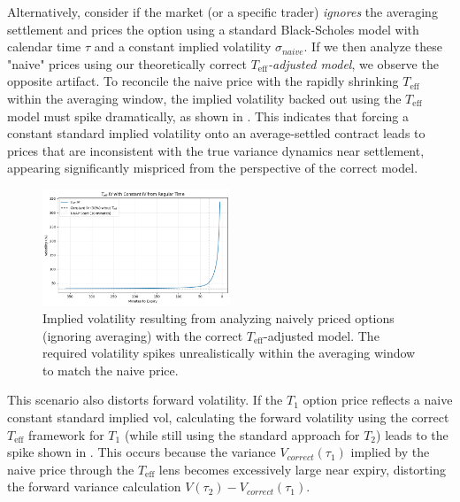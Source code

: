 \documentclass[11pt]{article}
\theoremstyle{plain}
\begin{document}
Alternatively, consider if the market (or a specific trader) \textit{ignores} the averaging settlement and prices the option using a standard Black-Scholes model with calendar time $\tau$ and a constant implied volatility $\sigma_{naive}$. If we then analyze these "naive" prices using our theoretically correct \textit{$T_{\mathrm{eff}}$-adjusted model}, we observe the opposite artifact. To reconcile the naive price with the rapidly shrinking $T_{\mathrm{eff}}$ within the averaging window, the implied volatility backed out using the $T_{\mathrm{eff}}$ model must spike dramatically, as shown in . This indicates that forcing a constant standard implied volatility onto an average-settled contract leads to prices that are inconsistent with the true variance dynamics near settlement, appearing significantly mispriced from the perspective of the correct model.

\begin{figure}[H]
    \centering
    \includegraphics[width=0.5\textwidth]{png4.png}
    \caption{Implied volatility resulting from analyzing naively priced options (ignoring averaging) with the correct $T_{\mathrm{eff}}$-adjusted model. The required volatility spikes unrealistically within the averaging window to match the naive price.}
    \label{fig:teff_iv_spike}
\end{figure}



This scenario also distorts forward volatility. If the $T_1$ option price reflects a naive constant standard implied vol, calculating the forward volatility using the correct $T_{\mathrm{eff}}$ framework for $T_1$ (while still using the standard approach for $T_2$) leads to the spike shown in . This occurs because the variance $V_{correct}(\tau_1)$ implied by the naive price through the $T_{\mathrm{eff}}$ lens becomes excessively large near expiry, distorting the forward variance calculation $V(\tau_2) - V_{correct}(\tau_1)$.
\end{document}
